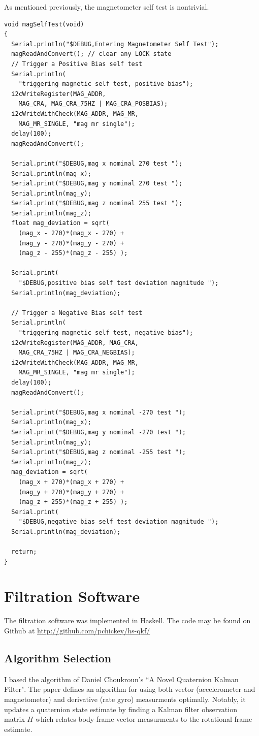 \documentclass[12pt]{report}
\begin{document}
As mentioned previously, the magnetometer self test is nontrivial.
\begin{lstlisting}
void magSelfTest(void)
{
  Serial.println("$DEBUG,Entering Magnetometer Self Test");
  magReadAndConvert(); // clear any LOCK state
  // Trigger a Positive Bias self test
  Serial.println(
    "triggering magnetic self test, positive bias");
  i2cWriteRegister(MAG_ADDR, 
    MAG_CRA, MAG_CRA_75HZ | MAG_CRA_POSBIAS);
  i2cWriteWithCheck(MAG_ADDR, MAG_MR, 
    MAG_MR_SINGLE, "mag mr single");
  delay(100);
  magReadAndConvert();

  Serial.print("$DEBUG,mag x nominal 270 test ");
  Serial.println(mag_x);
  Serial.print("$DEBUG,mag y nominal 270 test ");
  Serial.println(mag_y);
  Serial.print("$DEBUG,mag z nominal 255 test ");
  Serial.println(mag_z);  
  float mag_deviation = sqrt( 
    (mag_x - 270)*(mag_x - 270) + 
    (mag_y - 270)*(mag_y - 270) +
    (mag_z - 255)*(mag_z - 255) );

  Serial.print(
    "$DEBUG,positive bias self test deviation magnitude ");
  Serial.println(mag_deviation);  

  // Trigger a Negative Bias self test
  Serial.println(
    "triggering magnetic self test, negative bias");
  i2cWriteRegister(MAG_ADDR, MAG_CRA, 
    MAG_CRA_75HZ | MAG_CRA_NEGBIAS);
  i2cWriteWithCheck(MAG_ADDR, MAG_MR, 
    MAG_MR_SINGLE, "mag mr single");
  delay(100);
  magReadAndConvert();

  Serial.print("$DEBUG,mag x nominal -270 test ");
  Serial.println(mag_x);
  Serial.print("$DEBUG,mag y nominal -270 test ");
  Serial.println(mag_y);
  Serial.print("$DEBUG,mag z nominal -255 test ");
  Serial.println(mag_z);
  mag_deviation = sqrt( 
    (mag_x + 270)*(mag_x + 270) + 
    (mag_y + 270)*(mag_y + 270) +
    (mag_z + 255)*(mag_z + 255) );
  Serial.print(
    "$DEBUG,negative bias self test deviation magnitude ");
  Serial.println(mag_deviation);  
  
  return;
}
\end{lstlisting}

\section{Filtration Software}
The filtration software was implemented in Haskell. The code may be found on Github at \url{http://github.com/pchickey/hs-qkf/}
\lstset{language=Haskell}
\subsection{Algorithm Selection}
I based the algorithm of Daniel Choukroun's ``A Novel Quaternion Kalman Filter"\cite{choukroun04}. The paper defines an algorithm for using both vector (accelerometer and magnetometer) and derivative (rate gyro) measurments optimally. Notably, it updates a quaternion state estimate by finding a Kalman filter observation matrix $H$ which relates body-frame vector measurments to the rotational frame estimate.
\end{document}
